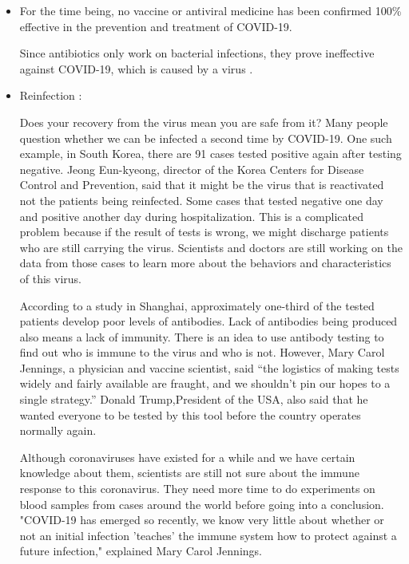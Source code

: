 \begin{itemize}
      \item For the time being, no vaccine or antiviral medicine has been confirmed 100\% effective in the prevention and treatment of COVID-19.
      \par Since antibiotics only work on bacterial infections, they prove ineffective against COVID-19, which is caused by a virus \parencite{Q&A_WHO}.
      \item Reinfection \parencite{Reinfection_abcnews} \parencite{Reinfection_independent}:
      \par Does your recovery from the virus mean you are safe from it? Many people question whether we can be infected a second time by COVID-19. One such example, in South Korea, there are 91 cases tested positive again after testing negative. Jeong Eun-kyeong, director of the Korea Centers for Disease Control and Prevention, said that it might be the virus that is reactivated not the patients being reinfected. Some cases that tested negative one day and positive another day during hospitalization. This is a complicated problem because if the result of tests is wrong, we might discharge patients who are still carrying the virus. Scientists and doctors are still working on the data from those cases to learn more about the behaviors and characteristics of this virus.
      \par According to a study in Shanghai, approximately one-third of the tested patients develop poor levels of antibodies. Lack of antibodies being produced also means a lack of immunity. There is an idea to use antibody testing to find out who is immune to the virus and who is not. However, Mary Carol Jennings, a physician and vaccine scientist, said “the logistics of making tests widely and fairly available are fraught, and we shouldn't pin our hopes to a single strategy.” Donald Trump,President of the USA, also said that he wanted everyone to be tested by this tool before the country operates normally again.
      \par Although coronaviruses have existed for a while and we have certain knowledge about them, scientists are still not sure about the immune response to this coronavirus. They need more time to do experiments on blood samples from cases around the world before going into a conclusion. "COVID-19 has emerged so recently, we know very little about whether or not an initial infection 'teaches' the immune system how to protect against a future infection," explained Mary Carol Jennings.
    \end{itemize}


